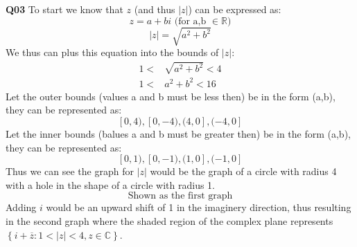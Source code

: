 \documentclass[11pt]{article}
\begin{document}
\parindent=0pt

\textbf{Q03} To start we know that $z$ (and thus $|z|$) can be expressed as:
\[ z = a + bi \text{ (for a,b $\in \mathbb R$)}  \]
\[ |z| = \sqrt{a^2+b^2}  \]
We thus can plus this equation into the bounds of $|z|$:
\begin{align*}
 1 < & \sqrt{a^2+b^2} < 4  \\
 1 < & a^2+b^2 < 16 
\end{align*}
Let the outer bounds (values a and b must be less then) be in the form (a,b), they can be represented as:
\[ [0,4), [0,-4), (4,0], (-4,0] \]
Let the inner bounds (balues a and b must be greater then) be in the form (a,b), they can be represented as:
\[ [0,1), [0,-1), (1,0], (-1,0] \]
Thus we can see the graph for $|z|$ would be the graph of a circle with radius 4 with a hole in the shape of a circle with radius 1. \\
\[ \text{Shown as the first graph} \]
Adding $i$ would be an upward shift of 1 in the imaginery direction, thus resulting in the second graph where the shaded region of the complex plane represents \mbox{$\left\{i + \overline z \colon 1 < |z| < 4, z \in \mathbb C\right\}$}.
\end{document}
